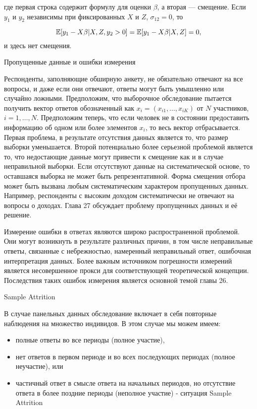 где первая строка содержит формулу для оценки $\beta$, а вторая ---  смещение. Если $y_{1}$ и $y_{2}$ независимы при фиксированных $X$ и $Z$, $\sigma_{12}=0$, то

\[
\mathbb{E}[y_{1}-X\beta|X,Z,y_{2}>0]=\mathbb{E}[y_{1}-X\beta|X,Z]=0,
\]
и здесь нет смещения.

\begin{center}
Пропущенные данные и ошибки измерения
\end{center}
Респонденты, заполняющие обширную анкету, не обязательно отвечают на все вопросы, и даже если они отвечают, ответы могут быть умышленно или случайно ложными. Предположим, что выборочное обследование пытается получить вектор ответов обозначенный как $x_{i}=(x_{i1},\dots,x_{iK})$ от $N$ участников, $i= 1,\dots,N$. Предположим теперь, что если человек не в состоянии предоставить информацию об одном или более элементов $x_{i}$, то весь вектор отбрасывается. Первая проблема, в результате отсутствия данных является то, что размер выборки уменьшается. Второй потенциально более серьезной проблемой является то, что недостающие данные могут привести к смещение как и в случае неправильной выборки. Если отсутствуют данные на систематической основе, то оставшаяся выборка не может быть репрезентативной. Форма смещения отбора может быть вызвана любым систематическим характером пропущенных данных. Например, респонденты с высоким доходом систематически не отвечают на вопросы о доходах. Глава 27 обсуждает проблему пропущенных данных и её решение.


Измерение ошибки в ответах являются широко распространенной проблемой. Они могут возникнуть в результате различных причин, в том числе неправильные ответы, связанные с небрежностью, намеренный неправильный ответ, ошибочная интерпретация данных. Более важным источником погрешности измерений является несовершенное прокси для соответствующей теоретической концепции. Последствия таких ошибок измерения является основной темой главы 26.


\begin{center}
Sample Attrition
\end{center}

В случае панельных данных обследование включает в себя повторные наблюдения на множество индивидов. В этом случае мы можем имеем:

\begin{itemize}
\item полные ответы во все периоды (полное участие),
\item нет ответов в первом периоде и во всех последующих периодах (полное неучастие), или
\item частичный ответ в смысле ответа на начальных периодов, но отсутствие ответа в более поздние периоды (неполное участие) - ситуация Sample Attrition
\end{itemize}



